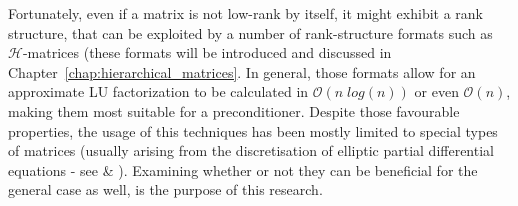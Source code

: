 Fortunately, even if a matrix is not low-rank by itself, it might exhibit a rank structure, that can be exploited by a number of rank-structure formats such as $\mathcal{H}$-matrices (these formats will be introduced and discussed in Chapter~\hyperref[chap:hierarchical_matrices]{\ref{chap:hierarchical_matrices}}.
In general, those formats allow for an approximate LU factorization to be calculated in $\mathcal{O}(n \;log(n))$ or even $\mathcal{O}(n)$, making them most suitable for a preconditioner. Despite those favourable properties, the usage of this techniques has been mostly limited to special types of matrices (usually arising from the discretisation of elliptic partial differential equations - see \cite{gatto_preconditioner_2015} \& \cite{gatto_efficient_2017}). Examining whether or not they can be beneficial for the general case as well, is the purpose of this research.